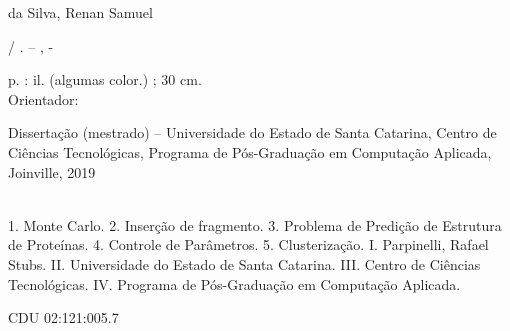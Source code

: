 \imprimircapa

\imprimirfolhaderosto*

%     

\begin{fichacatalografica}
  \vspace*{\fill}					%
  \begin{center}					%
    \begin{minipage}[c]{12.5cm}		%

      da Silva, Renan Samuel

      \hspace{0.5cm} \imprimirtitulo  / \imprimirautor. --
      \imprimirlocal, \imprimirdata-

      \hspace{0.5cm} \pageref{LastPage} p. : il. (algumas color.) ; 30 cm.\\

      \hspace{0.5cm} Orientador: \imprimirorientadorRotulo~\imprimirorientador\\

      \hspace{0.5cm}
      \parbox[t]{\textwidth}{Dissertação (mestrado) -- Universidade do Estado de Santa Catarina, Centro de Ciências Tecnológicas, Programa de Pós-Graduação em Computação Aplicada, Joinville, 2019}\\

      \hspace{0.5cm}
      1. Monte Carlo.
      2. Inserção de fragmento.
      3. Problema de Predição de Estrutura de Proteínas.
      4. Controle de Parâmetros.
      5. Clusterização.
      I. Parpinelli, Rafael Stubs.
      II. Universidade do Estado de Santa Catarina.
      III. Centro de Ciências Tecnológicas.
      IV. Programa de Pós-Graduação em Computação Aplicada.

      \hspace{8.75cm} CDU 02:121:005.7\\

    \end{minipage}
  \end{center}
\end{fichacatalografica}

